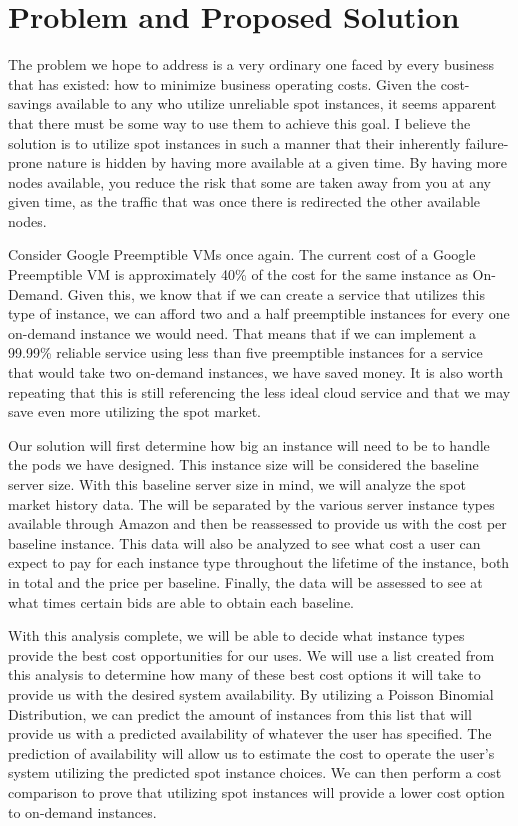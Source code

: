 \documentclass[thesis,proposal]{umassthesis}  %
\begin{document}
\section{Problem and Proposed Solution}

The problem we hope to address is a very ordinary one faced by every business that has existed: how to minimize business operating costs. Given the cost-savings available to any who utilize unreliable spot instances, it seems apparent that there must be some way to use them to achieve this goal. I believe the solution is to utilize spot instances in such a manner that their inherently failure-prone nature is hidden by having more available at a given time. By having more nodes available, you reduce the risk that some are taken away from you at any given time, as the traffic that was once there is redirected the other available nodes.\par

Consider Google Preemptible VMs once again. The current cost of a Google Preemptible VM is approximately 40\% of the cost for the same instance as On-Demand. Given this, we know that if we can create a service that utilizes this type of instance, we can afford two and a half preemptible instances for every one on-demand instance we would need. That means that if we can implement a 99.99\% reliable service using less than five preemptible instances for a service that would take two on-demand instances, we have saved money. It is also worth repeating that this is still referencing the less ideal cloud service and that we may save even more utilizing the spot market.\par

Our solution will first determine how big an instance will need to be to handle the pods we have designed. This instance size will be considered the baseline server size. With this baseline server size in mind, we will analyze the spot market history data. The will be separated by the various server instance types available through Amazon and then be reassessed to provide us with the cost per baseline instance. This data will also be analyzed to see what cost a user can expect to pay for each instance type throughout the lifetime of the instance, both in total and the price per baseline. Finally, the data will be assessed to see at what times certain bids are able to obtain each baseline.\par

With this analysis complete, we will be able to decide what instance types provide the best cost opportunities for our uses. We will use a list created from this analysis to determine how many of these best cost options it will take to provide us with the desired system availability. By utilizing a Poisson Binomial Distribution, we can predict the amount of instances from this list that will provide us with a predicted availability of whatever the user has specified. The prediction of availability will allow us to estimate the cost to operate the user's system utilizing the predicted spot instance choices. We can then perform a cost comparison to prove that utilizing spot instances will provide a lower cost option to on-demand instances. \par
\end{document}
